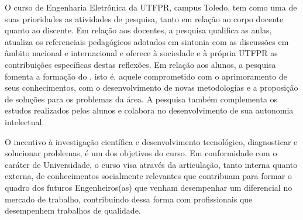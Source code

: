 O curso de Engenharia Eletrônica da UTFPR, campus Toledo, tem como uma de suas prioridades as atividades de pesquisa, tanto em relação ao corpo docente quanto ao discente. Em relação aos docentes, a pesquisa qualifica as aulas, atualiza os referenciais pedagógicos adotados em sintonia com as discussões em âmbito nacional e internacional e oferece à sociedade e à própria UTFPR as contribuições específicas destas reflexões. Em relação aos alunos, a pesquisa fomenta a formação do , isto é, aquele comprometido com o aprimoramento de seus conhecimentos, com o desenvolvimento de novas metodologias e a proposição de soluções para os problemas da área. A pesquisa também complementa os estudos realizados pelos alunos e colabora no desenvolvimento de sua autonomia intelectual.

O incentivo à investigação científica e desenvolvimento tecnológico, diagnosticar e solucionar problemas, é um dos objetivos do curso. Em conformidade com o caráter de Universidade, o curso visa através da articulação, tanto interna quanto externa, de conhecimentos socialmente relevantes que contribuam para formar o quadro dos futuros Engenheiros(as) que venham desempenhar um diferencial no mercado de trabalho, contribuindo dessa forma com profissionais que desempenhem trabalhos de qualidade.

